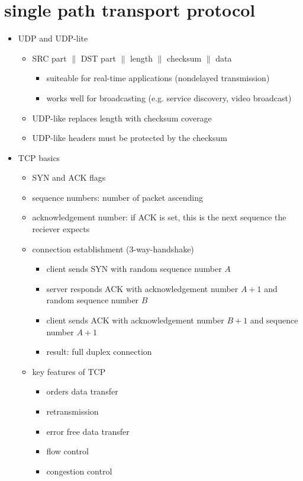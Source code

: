 \documentclass[a4paper,10pt]{scrreprt}
\begin{document}
\section{single path transport protocol}
\begin{itemize}
 \item UDP and UDP-lite
 \begin{itemize}
  \item SRC part $\|$ DST part $\|$ length $\|$ checksum $\|$ data 
  \begin{itemize}
   \item suiteable for real-time applications (nondelayed transmission)
   \item works well for broadcasting (e.g. service discovery, video broadcast)
  \end{itemize}
  \item UDP-like replaces length with checksum coverage
  \item UDP-like headers must be protected by the checksum
 \end{itemize}
 \item TCP basics
 \begin{itemize}
  \item SYN and ACK flags
  \item sequence numbers: number of packet ascending
  \item acknowledgement number: if ACK is set, this is the next sequence the reciever expects
  \item connection establishment (3-way-handshake)
  \begin{itemize}
   \item client sends SYN with random sequence number $A$
   \item server responds ACK with acknowledgement number $A+1$ and random sequence number $B$
   \item client sends ACK with acknowledgement number $B+1$ and sequence number $A+1$
   \item result: full duplex connection
  \end{itemize}
  \item key features of TCP
  \begin{itemize}
   \item orders data transfer
   \item retransmission
   \item error free data transfer
   \item flow control
   \item congestion control
  \end{itemize}

\end{itemize}
\end{itemize}
\end{document}
